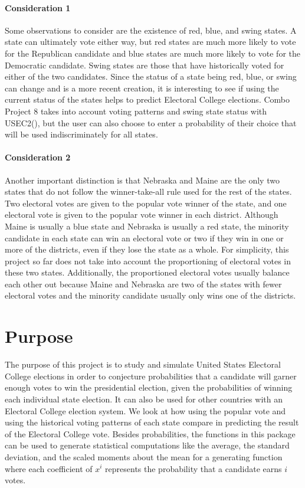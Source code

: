 \documentclass[12pt]{article}
\begin{document}
\paragraph{Consideration 1} Some observations to consider are the existence of red, blue, and swing states. A state can ultimately vote either way, but red states are much more likely to vote for the Republican candidate and blue states are much more likely to vote for the Democratic candidate. Swing states are those that have historically voted for either of the two candidates. Since the status of a state being red, blue, or swing can change and is a more recent creation, it is interesting to see if using the current status of the states helps to predict Electoral College elections. Combo Project 8 takes into account voting patterns and swing state status with USEC2(), but the user can also choose to enter a probability of their choice that will be used indiscriminately for all states.

\paragraph{Consideration 2}  Another important distinction is that Nebraska and Maine are the only two states that do not follow the winner-take-all rule used for the rest of the states. Two electoral votes are given to the popular vote winner of the state, and one electoral vote is given to the popular vote winner in each district. Although Maine is usually a blue state and Nebraska is usually a red state, the minority candidate in each state can win an electoral vote or two if they win in one or more of the districts, even if they lose the state as a whole. For simplicity, this project so far does not take into account the proportioning of electoral votes in these two states. Additionally, the proportioned electoral votes usually balance each other out because Maine and Nebraska are two of the states with fewer electoral votes and the minority candidate usually only wins one of the districts.

\section{Purpose}

The purpose of this project is to study and simulate United States Electoral College elections in order to conjecture probabilities that a candidate will garner enough votes to win the presidential election, given the probabilities of winning each individual state election. It can also be used for other countries with an Electoral College election system. We look at how using the popular vote and using the historical voting patterns of each state compare in predicting the result of the Electoral College vote. Besides probabilities, the functions in this package can be used to generate statistical computations like the average, the standard deviation, and the scaled moments about the mean for a generating function where each coefficient of $x^i$ represents the probability that a candidate earns $i$ votes.
\end{document}
